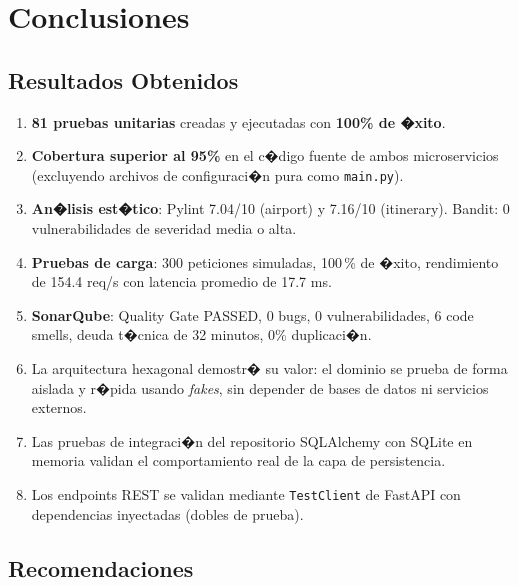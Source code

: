 \documentclass[12pt,a4paper]{article}
\begin{document}
\section{Conclusiones}

\subsection{Resultados Obtenidos}

\begin{enumerate}
  \item \textbf{81 pruebas unitarias} creadas y ejecutadas con \textbf{100\% de �xito}.
  \item \textbf{Cobertura superior al 95\%} en el c�digo fuente de ambos microservicios
        (excluyendo archivos de configuraci�n pura como \texttt{main.py}).
  \item \textbf{An�lisis est�tico}: Pylint 7.04/10 (airport) y 7.16/10 (itinerary).
        Bandit: 0 vulnerabilidades de severidad media o alta.
  \item \textbf{Pruebas de carga}: 300 peticiones simuladas, 100\,\% de �xito,
        rendimiento de 154.4 req/s con latencia promedio de 17.7 ms.
  \item \textbf{SonarQube}: Quality Gate PASSED, 0 bugs, 0 vulnerabilidades,
        6 code smells, deuda t�cnica de 32 minutos, 0\% duplicaci�n.
  \item La arquitectura hexagonal demostr� su valor: el dominio se prueba de forma
        aislada y r�pida usando \textit{fakes}, sin depender de bases de datos ni
        servicios externos.
  \item Las pruebas de integraci�n del repositorio SQLAlchemy con SQLite en memoria
        validan el comportamiento real de la capa de persistencia.
  \item Los endpoints REST se validan mediante \texttt{TestClient} de FastAPI con
        dependencias inyectadas (dobles de prueba).
\end{enumerate}

\subsection{Recomendaciones}
\end{document}
